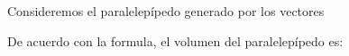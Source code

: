\begin{examplebox}{}{}
    Consideremos el paralelepípedo generado por los vectores
    \begin{matrizn}
    \end{matrizn}
    De acuerdo con la formula, el volumen del paralelepípedo es:
    \begin{matrizn}
    \end{matrizn}
\end{examplebox}